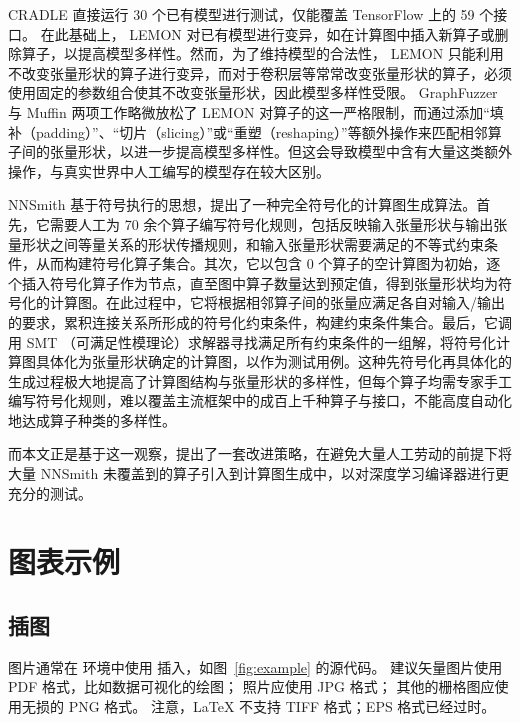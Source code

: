 CRADLE\cite{cradle} 直接运行 30 个已有模型进行测试，仅能覆盖 TensorFlow 上的 59 个接口。
在此基础上， LEMON\cite{lemon} 对已有模型进行变异，如在计算图中插入新算子或删除算子，以提高模型多样性。然而，为了维持模型的合法性， LEMON 只能利用不改变张量形状的算子进行变异，而对于卷积层等常常改变张量形状的算子，必须使用固定的参数组合使其不改变张量形状，因此模型多样性受限。
GraphFuzzer\cite{graphfuzzer} 与 Muffin\cite{muffin} 两项工作略微放松了 LEMON 对算子的这一严格限制，而通过添加“填补（padding）”、“切片（slicing）”或“重塑（reshaping）”等额外操作来匹配相邻算子间的张量形状，以进一步提高模型多样性。但这会导致模型中含有大量这类额外操作，与真实世界中人工编写的模型存在较大区别。

NNSmith\cite{nnsmith} 基于符号执行的思想，提出了一种完全符号化的计算图生成算法。首先，它需要人工为 70 余个算子编写符号化规则，包括反映输入张量形状与输出张量形状之间等量关系的形状传播规则，和输入张量形状需要满足的不等式约束条件，从而构建符号化算子集合。其次，它以包含 0 个算子的空计算图为初始，逐个插入符号化算子作为节点，直至图中算子数量达到预定值，得到张量形状均为符号化的计算图。在此过程中，它将根据相邻算子间的张量应满足各自对输入/输出的要求，累积连接关系所形成的符号化约束条件，构建约束条件集合。最后，它调用 SMT （可满足性模理论）求解器寻找满足所有约束条件的一组解，将符号化计算图具体化为张量形状确定的计算图，以作为测试用例。这种先符号化再具体化的生成过程极大地提高了计算图结构与张量形状的多样性，但每个算子均需专家手工编写符号化规则，难以覆盖主流框架中的成百上千种算子与接口，不能高度自动化地达成算子种类的多样性。




\iffalse
而本文正是基于这一观察，提出了一套改进策略，在避免大量人工劳动的前提下将大量 NNSmith 未覆盖到的算子引入到计算图生成中，以对深度学习编译器进行更充分的测试。

\chapter{图表示例}

\section{插图}

图片通常在  环境中使用  插入，如图~\ref{fig:example} 的源代码。
建议矢量图片使用 PDF 格式，比如数据可视化的绘图；
照片应使用 JPG 格式；
其他的栅格图应使用无损的 PNG 格式。
注意，LaTeX 不支持 TIFF 格式；EPS 格式已经过时。

